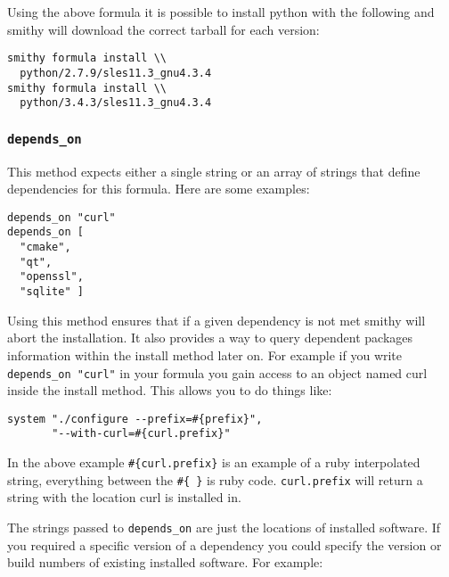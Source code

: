\documentclass{acm_proc_article-sp}
\begin{document}
Using the above formula it is possible to install python with the following and
smithy will download the correct tarball for each version:

\begin{quoting}
\begin{verbatim}
smithy formula install \\
  python/2.7.9/sles11.3_gnu4.3.4
smithy formula install \\
  python/3.4.3/sles11.3_gnu4.3.4
\end{verbatim}
\end{quoting}

\subsubsection{\texttt{depends\_on}}

This method expects either a single string or an array of strings that define
dependencies for this formula. Here are some examples:

\begin{quoting}
\begin{verbatim}
depends_on "curl"
depends_on [
  "cmake",
  "qt",
  "openssl",
  "sqlite" ]
\end{verbatim}
\end{quoting}

Using this method ensures that if a given dependency is not met smithy will
abort the installation. It also provides a way to query dependent packages
information within the install method later on. For example if you write
\texttt{depends\_on "curl"} in your formula you gain access to an object named curl
inside the install method. This allows you to do things like:

\begin{quoting}
\begin{verbatim}
system "./configure --prefix=#{prefix}",
       "--with-curl=#{curl.prefix}"
\end{verbatim}
\end{quoting}

In the above example \texttt{\#\{curl.prefix\}} is an example of a ruby
interpolated string, everything between the \texttt{\#\{ \}} is ruby code.
\texttt{curl.prefix} will return a string with the location curl is installed
in.

The strings passed to \texttt{depends\_on} are just the locations of installed
software.  If you required a specific version of a dependency you could
specify the version or build numbers of existing installed software. For
example:
\end{document}
